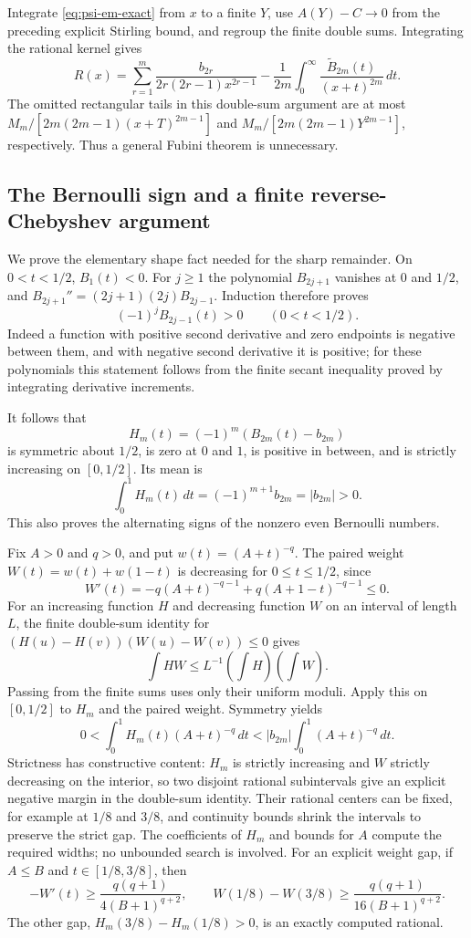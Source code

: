 Integrate \eqref{eq:psi-em-exact} from $x$ to a finite $Y$, use
$A(Y)-C\to0$ from the preceding explicit Stirling bound, and regroup the
finite double sums.  Integrating the rational kernel gives
\begin{equation}\label{eq:loggamma-em-exact}
 R(x)=\sum_{r=1}^{m}\frac{b_{2r}}{2r(2r-1)x^{2r-1}}
 -\frac1{2m}\int_0^\infty
             \frac{\widetilde B_{2m}(t)}{(x+t)^{2m}}\,dt.
\end{equation}
The omitted rectangular tails in this double-sum argument are at most
$M_m/[2m(2m-1)(x+T)^{2m-1}]$ and
$M_m/[2m(2m-1)Y^{2m-1}]$, respectively.  Thus a general Fubini theorem
is unnecessary.

\subsection{The Bernoulli sign and a finite reverse-Chebyshev argument}

We prove the elementary shape fact needed for the sharp remainder.
On $0<t<1/2$, $B_1(t)<0$.  For $j\ge1$ the polynomial $B_{2j+1}$ vanishes
at $0$ and $1/2$, and
$B_{2j+1}''=(2j+1)(2j)B_{2j-1}$.  Induction therefore proves
\[
 (-1)^jB_{2j-1}(t)>0\qquad(0<t<1/2).
\]
Indeed a function with positive second derivative and zero endpoints is
negative between them, and with negative second derivative it is
positive; for these polynomials this statement follows from the finite
secant inequality proved by integrating derivative increments.

It follows that
\[
 H_m(t)=(-1)^m(B_{2m}(t)-b_{2m})
\]
is symmetric about $1/2$, is zero at $0$ and $1$, is positive in between,
and is strictly increasing on $[0,1/2]$.  Its mean is
\[
 \int_0^1H_m(t)\,dt=(-1)^{m+1}b_{2m}=|b_{2m}|>0.
\]
This also proves the alternating signs of the nonzero even Bernoulli
numbers.

Fix $A>0$ and $q>0$, and put $w(t)=(A+t)^{-q}$.  The paired weight
$W(t)=w(t)+w(1-t)$ is decreasing for $0\le t\le1/2$, since
\[
 W'(t)=-q(A+t)^{-q-1}+q(A+1-t)^{-q-1}\le0.
\]
For an increasing function $H$ and decreasing function $W$ on an interval
of length $L$, the finite double-sum identity for
$(H(u)-H(v))(W(u)-W(v))\le0$ gives
\[
 \int HW\le L^{-1}\left(\int H\right)\left(\int W\right).
\]
Passing from the finite sums uses only their uniform moduli.  Apply this
on $[0,1/2]$ to $H_m$ and the paired weight.  Symmetry yields
\begin{equation}\label{eq:bernoulli-weight-bound}
 0<\int_0^1H_m(t)(A+t)^{-q}\,dt
 <|b_{2m}|\int_0^1(A+t)^{-q}\,dt.
\end{equation}
Strictness has constructive content: $H_m$ is strictly increasing and
$W$ strictly decreasing on the interior, so two disjoint rational
subintervals give an explicit negative margin in the double-sum
identity.  Their rational centers can be fixed, for example at $1/8$
and $3/8$, and continuity bounds shrink the intervals to preserve the
strict gap.  The coefficients of $H_m$ and bounds for $A$ compute the
required widths; no unbounded search is involved.
For an explicit weight gap, if $A\le B$ and $t\in[1/8,3/8]$, then
\[
 -W'(t)\ge\frac{q(q+1)}{4(B+1)^{q+2}},\qquad
 W(1/8)-W(3/8)\ge\frac{q(q+1)}{16(B+1)^{q+2}}.
\]
The other gap, $H_m(3/8)-H_m(1/8)>0$, is an exactly computed rational.


